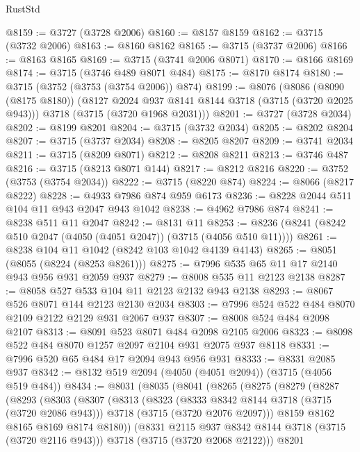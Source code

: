 \begin{lexlean}{RustStd}
\begin{coremodule}
@8159 := @3727 (@3728 @2006)
@8160 := @8157 @8159
@8162 := @3715 (@3732 @2006)
@8163 := @8160 @8162
@8165 := @3715 (@3737 @2006)
@8166 := @8163 @8165
@8169 := @3715 (@3741 @2006 @8071)
@8170 := @8166 @8169
@8174 := @3715 (@3746 @489 @8071 @484)
@8175 := @8170 @8174
@8180 := @3715 (@3752 (@3753 (@3754 @2006)) @874)
@8199 := @8076
    (@8086
      (@8090 (@8175 @8180))
      (@8127 @2024 @937 @8141 @8144 @3718 (@3715 (@3720 @2025 @943)))
      @3718
      (@3715 (@3720 @1968 @2031)))
@8201 := @3727 (@3728 @2034)
@8202 := @8199 @8201
@8204 := @3715 (@3732 @2034)
@8205 := @8202 @8204
@8207 := @3715 (@3737 @2034)
@8208 := @8205 @8207
@8209 := @3741 @2034
@8211 := @3715 (@8209 @8071)
@8212 := @8208 @8211
@8213 := @3746 @487
@8216 := @3715 (@8213 @8071 @144)
@8217 := @8212 @8216
@8220 := @3752 (@3753 (@3754 @2034))
@8222 := @3715 (@8220 @874)
@8224 := @8066 (@8217 @8222)
@8228 := @4933 @7986 @874 @959 @6173
@8236 := @8228 @2044 @511 @104 @11 @943 @2047 @943 @1042
@8238 := @4962 @7986 @874
@8241 := @8238 @511 @11 @2047
@8242 := @8131 @11
@8253 := @8236 (@8241 (@8242 @510 @2047 (@4050 (@4051 @2047)) (@3715 (@4056 @510 @11))))
@8261 := @8238 @104 @11 @1042 (@8242 @103 @1042 @4139 @4143)
@8265 := @8051 (@8055 (@8224 (@8253 @8261)))
@8275 := @7996 @535 @65 @11 @17 @2140 @943 @956 @931 @2059 @937
@8279 := @8008 @535 @11 @2123 @2138
@8287 := @8058 @527 @533 @104 @11 @2123 @2132 @943 @2138
@8293 := @8067 @526 @8071 @144 @2123 @2130 @2034
@8303 := @7996 @524 @522 @484 @8070 @2109 @2122 @2129 @931 @2067 @937
@8307 := @8008 @524 @484 @2098 @2107
@8313 := @8091 @523 @8071 @484 @2098 @2105 @2006
@8323 := @8098 @522 @484 @8070 @1257 @2097 @2104 @931 @2075 @937 @8118
@8331 := @7996 @520 @65 @484 @17 @2094 @943 @956 @931
@8333 := @8331 @2085 @937
@8342 := @8132 @519 @2094 (@4050 (@4051 @2094)) (@3715 (@4056 @519 @484))
@8434 := @8031
    (@8035
      (@8041
        (@8265
          (@8275
            (@8279
              (@8287
                (@8293
                  (@8303
                    (@8307
                      (@8313
                        (@8323
                          (@8333 @8342 @8144 @3718 (@3715 (@3720 @2086 @943)))
                          @3718
                          (@3715 (@3720 @2076 @2097)))
                        @8159
                        @8162
                        @8165
                        @8169
                        @8174
                        @8180))
                    (@8331 @2115 @937 @8342 @8144 @3718 (@3715 (@3720 @2116 @943)))
                    @3718
                    (@3715 (@3720 @2068 @2122)))
                  @8201

\end{coremodule}
\end{lexlean}
